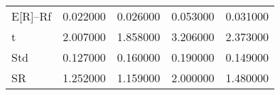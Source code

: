 \begin{tabular}{lrrrr}
\toprule
\midrule
E[R]--Rf & 0.022000 & 0.026000 & 0.053000 & 0.031000 \\
t & 2.007000 & 1.858000 & 3.206000 & 2.373000 \\
Std & 0.127000 & 0.160000 & 0.190000 & 0.149000 \\
SR & 1.252000 & 1.159000 & 2.000000 & 1.480000 \\
\bottomrule
\end{tabular}
